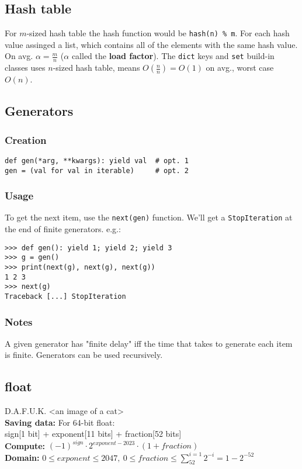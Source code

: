 \documentclass[]{article}
\begin{document}
\begin{multicols}{2}
		\subsection{Hash table}
		For $ m $-sized hash table the hash function would be \texttt{hash(n) \% m}. For each hash value assinged a list, which contains all of the elements with the same hash value. On avg. $ \alpha = \tfrac{m}{n} $ ($ \alpha $ called the \textbf{load factor}). The \texttt{dict} keys and \texttt{set} build-in classes uses $ n $-sized hash table, means $ O(\tfrac{n}{n}) = O(1) $ on avg., worst case $ O(n) $. 
		
		\subsection{Generators}
		\subsubsection{Creation}
		\begin{lstlisting}
def gen(*arg, **kwargs): yield val  # opt. 1
gen = (val for val in iterable)     # opt. 2\end{lstlisting}
		\subsubsection{Usage}
		To get the next item, use the \texttt{next(gen)} function. We'll get a \texttt{StopIteration} at the end of finite generators. e.g.:
		\begin{lstlisting}[emph={StopIteration,Traceback}]
>>> def gen(): yield 1; yield 2; yield 3
>>> g = gen()
>>> print(next(g), next(g), next(g))
1 2 3
>>> next(g)
Traceback [...] StopIteration\end{lstlisting}
		\subsubsection{Notes}
		A given generator has "finite delay" iff the time that takes to generate each item is finite.
		Generators can be used recursively. 
		
		\subsection{float}
		D.A.F.U.K. <an image of a cat> \\
		\textbf{Saving data: }
		For 64-bit float: \\
		sign[1 bit] + exponent[11 bits] + fraction[52 bits] \\
		\textbf{Compute: } $ (-1)^{sign} \cdot 2^{exponent - 2023} \cdot (1 + fraction) $ \\
		\textbf{Domain: }$ 0 \le exponent \le 2047, \ 0 \le fraction \le \sum_{52}^{i = 1} 2^{-i} = 1 - 2^{-52} $
		

\end{multicols}
\end{document}
